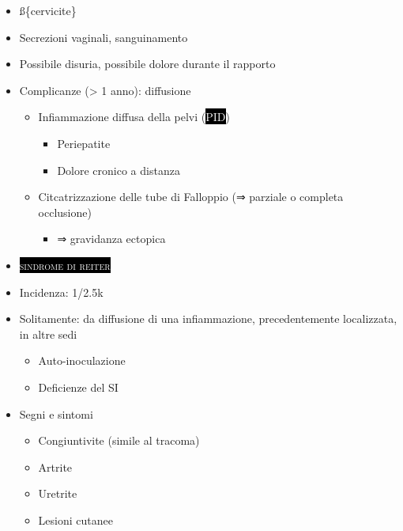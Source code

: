 \documentclass[italian,]{article}
\providecommand{\tightlist}{%
  \setlength{\itemsep}{0pt}\setlength{\parskip}{0pt}}
\newcommand{\pat}[1]{\colorbox{black}{\textcolor{white}{\textsc{#1}}}}
\newcommand{\normalbox}[2]{\begin{tcolorbox}[title=#1]#2\end{tcolorbox}} %
\begin{document}
\begin{itemize}
\begin{itemize}
    \begin{itemize}
    \item
      \ss\{cervicite\}
    \item
      Secrezioni vaginali, sanguinamento
    \item
      Possibile disuria, possibile dolore durante il rapporto
    \item
      Complicanze (\textgreater{} 1 anno): diffusione

      \begin{itemize}
      \tightlist
      \item
        Infiammazione diffusa della pelvi (\pat{PID})

        \begin{itemize}
        \tightlist
        \item
          Periepatite
        \item
          Dolore cronico a distanza
        \end{itemize}
      \item
        Citcatrizzazione delle tube di Falloppio (⇒ parziale o completa
        occlusione)

        \begin{itemize}
        \tightlist
        \item
          ⇒ gravidanza ectopica
        \end{itemize}
      \end{itemize}
    \item
      \pat{sindrome di reiter}
    \end{itemize}
  \end{itemize}
\end{itemize}

\normalbox{Sindrome di Reiter}{
\begin{itemize}
\tightlist
\item
  Incidenza: 1/2.5k
\item
  Solitamente: da diffusione di una infiammazione, precedentemente
  localizzata, in altre sedi

  \begin{itemize}
  \tightlist
  \item
    Auto-inoculazione
  \item
    Deficienze del SI
  \end{itemize}
\item
  Segni e sintomi

  \begin{itemize}
  \tightlist
  \item
    Congiuntivite (simile al tracoma)
  \item
    Artrite
  \item
    Uretrite
  \item
    Lesioni cutanee
  \end{itemize}
\end{itemize}
}
\end{document}
